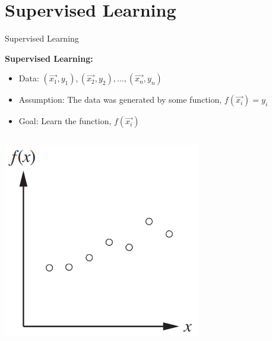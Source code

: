\documentclass[8pt,aspectratio=169]{beamer}
\begin{document}
\section{Supervised Learning}


\begin{frame}{Supervised Learning}

\textbf{Supervised Learning:}
\newline

\begin{itemize}
\item \pause
  Data: $(\vec{x_1}, y_1), (\vec{x_2}, y_2), ..., (\vec{x_n}, y_n)$
\item \pause
  Assumption: The data was generated by some function, $f(\vec{x_i}) = y_i$
\item \pause
  Goal: Learn the function, $f(\vec{x_i})$
\end{itemize}

\vspace{-3.5mm}

\pause
\begin{columns}[T] %
\begin{column}{.2\textwidth}
\begin{center}
  \includegraphics[scale=0.65]{figures/supervised-learn-f-1}
\end{center}
\end{column}


\end{columns}
\end{frame}
\end{document}
